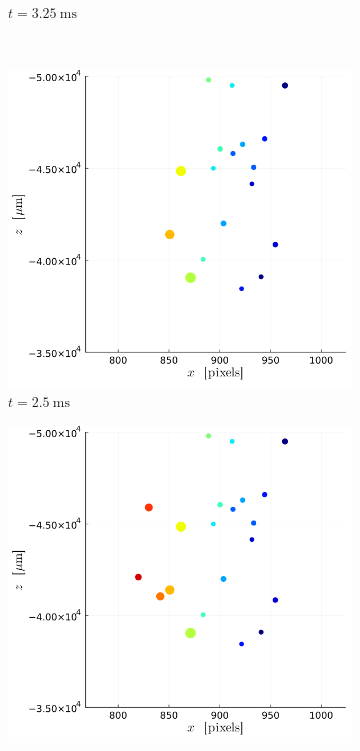 \begin{figure}[H]
\begin{subfigure}[t]{0.32\linewidth}
        \caption*{$t = \SI{3.25}{\ms}$}
    \end{subfigure}
    \\
    \begin{subfigure}[t]{0.32\linewidth}
        \includegraphics[width=\linewidth]{./Figure/4_Results/exp/xz_detailed_view/out0011.png}
        \caption*{$t = \SI{2.5}{\ms}$}
    \end{subfigure}
    \begin{subfigure}[t]{0.32\linewidth}
        \includegraphics[width=\linewidth]{./Figure/4_Results/exp/xz_detailed_view/out0015.png}

\end{subfigure}
\end{figure}
